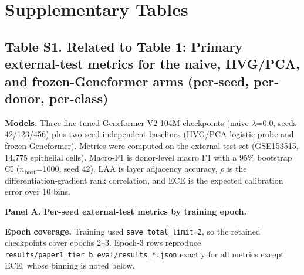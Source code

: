 \documentclass[12pt,a4paper]{article}
\begin{document}
\clearpage

\section*{Supplementary Tables}

\needspace{45mm}
\subsection*{Table S1. Related to Table 1: Primary external-test metrics for the naive, HVG/PCA, and frozen-Geneformer arms (per-seed, per-donor, per-class)}
\label{tab:S1}

\textbf{Models.} Three fine-tuned Geneformer-V2-104M checkpoints (naive $\lambda$=0.0, seeds 42/123/456) plus two seed-independent baselines (HVG/PCA logistic probe and frozen Geneformer). Metrics were computed on the external test set (GSE153515, 14,775 epithelial cells). Macro-F1 is donor-level macro F1 with a 95\% bootstrap CI ($n_{\mathrm{boot}}$=1000, seed 42), LAA is layer adjacency accuracy, $\rho$ is the differentiation-gradient rank correlation, and ECE is the expected calibration error over 10 bins.

\textbf{Panel A. Per-seed external-test metrics by training epoch.}

\textbf{Epoch coverage.} Training used \texttt{save\_total\_limit=2}, so the retained checkpoints cover epochs 2--3. Epoch-3 rows reproduce \texttt{results/paper1\_tier\_b\_eval/results\_*.json} exactly for all metrics except ECE, whose binning is noted below.
\end{document}
